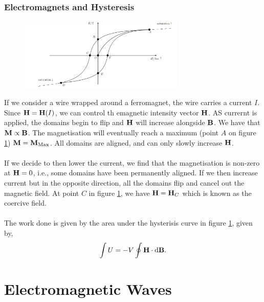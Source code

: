 \documentclass{book}
\begin{document}
\subsection{Electromagnets and Hysteresis}
\begin{figure}
	\centering
	\includegraphics[width=0.7\textwidth]{B-H graph.png}
	\caption{}
	\label{fig:bhgraph}
\end{figure}
If we consider a wire wrapped around a ferromagnet, the wire carries a current $I$. Since $\vb{H} = \vb{H}(I)$, we can control th emagnetic intensity vector $\vb{H}$. AS currernt is applied, the domains begin to flip and $\vb{H}$ will increase alongside $\vb{B}$. We have that $\vb{M} \propto \vb{B}$. The magnetisation will eventually reach a maximum (point $A$ on figure \ref{fig:bhgraph}) $\vb{M} = \vb{M}_{\text{Max}}$. All domains are aligned, and can only slowly increase $\vb{H}$.
\\\\
If we decide to then lower the current, we find that the magnetisation is non-zero at $\vb{H} = 0$, i.e., some domains have been permanently aligned. If we then increase current but in the opposite direction, all the domains flip and cancel out the magnetic field. At point $C$ in figure \ref{fig:bhgraph}, we have $\vb{H} = \vb{H}_C$ which is known as the coercive field. 
\\\\
The work done is given by the area under the hysterisis curve in figure \ref{fig:bhgraph}, given by,
\begin{equation}
	\int U = -V \oint \vb{H} \cdot{\dd{\vb{B}}}.
\end{equation} 
\chapter{Electromagnetic Waves} 
\end{document}
